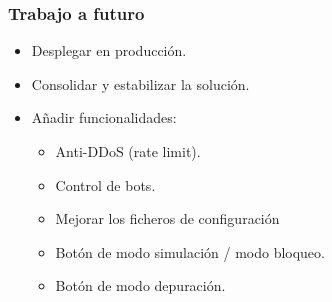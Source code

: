 \begin{frame}[shrink]
  \frametitle{Trabajo a futuro}
  \begin{itemize}
    \item Desplegar en producción. \\
    \item Consolidar y estabilizar la solución. \\
    \item Añadir funcionalidades: \\
      \begin{itemize}
        \item Anti-DDoS (rate limit). \\
        \item Control de bots. \\
        \item Mejorar los ficheros de configuración \\
        \item Botón de modo simulación / modo bloqueo. \\
        \item Botón de modo depuración. \\
    \end{itemize}
  \end{itemize}
\end{frame}


